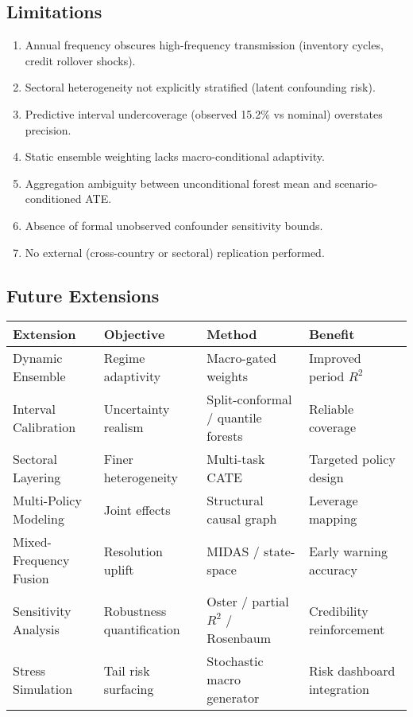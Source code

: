 \subsection{Limitations}
\begin{enumerate}
  \item Annual frequency obscures high-frequency transmission (inventory cycles, credit rollover shocks).
  \item Sectoral heterogeneity not explicitly stratified (latent confounding risk).
  \item Predictive interval undercoverage (observed 15.2\% vs nominal) overstates precision.
  \item Static ensemble weighting lacks macro-conditional adaptivity.
  \item Aggregation ambiguity between unconditional forest mean and scenario-conditioned ATE.
  \item Absence of formal unobserved confounder sensitivity bounds.
  \item No external (cross-country or sectoral) replication performed.
\end{enumerate}

\subsection{Future Extensions}
\begin{table}[htbp]
\centering
\small
\begin{tabular}{@{}p{}p{}p{}p{}@{}}
	 Extension & Objective & Method & Benefit \\
\midrule
Dynamic Ensemble & Regime adaptivity & Macro-gated weights & Improved period $R^2$ \\
Interval Calibration & Uncertainty realism & Split-conformal / quantile forests & Reliable coverage \\
Sectoral Layering & Finer heterogeneity & Multi-task CATE & Targeted policy design \\
Multi-Policy Modeling & Joint effects & Structural causal graph & Leverage mapping \\
Mixed-Frequency Fusion & Resolution uplift & MIDAS / state-space & Early warning accuracy \\
Sensitivity Analysis & Robustness quantification & Oster / partial $R^2$ / Rosenbaum & Credibility reinforcement \\
Stress Simulation & Tail risk surfacing & Stochastic macro generator & Risk dashboard integration \\
\bottomrule
\end{tabular}
\end{table}
